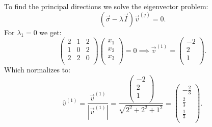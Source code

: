 \begin{derivation}
   To find the principal directions we solve the eigenvector problem:
   \begin{equation*}
     (\Vec{\sigma} - \lambda \Vec{I}) \Vec{v}^{(j)} = 0
   .\end{equation*}
   For $\lambda_1 = 0$ we get:
   \begin{equation*}
     \begin{pmatrix}
       2 & 1 & 2\\
     1 & 0 & 2\\
     2 & 2 & 0\\
     \end{pmatrix} \begin{pmatrix}
       x_1 \\
     x_2\\
     x_3\\
     \end{pmatrix} = 0 \implies \Vec{v}^{(1)} = \begin{pmatrix}
       -2\\
     2\\
     1\\
     \end{pmatrix}
   .\end{equation*}
   Which normalizes to:
   \begin{equation*}
     \hat{v}^{(1)} = \frac{\Vec{v}^{(1)}}{\left| \Vec{v}^{(1)} \right|} = \frac{\begin{pmatrix}
       -2\\
     2\\
     1\\
     \end{pmatrix}}{\sqrt{2^2 + 2^2 + 1^2}} = \left(
\begin{array}{c}
 -\frac{2}{3} \\
 \frac{2}{3} \\
 \frac{1}{3} \\
\end{array}
\right)
   .\end{equation*}
   

\end{derivation}
